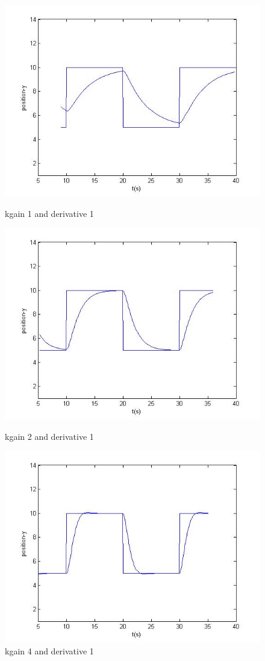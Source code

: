 \begin{figure}[!htb]
\captionsetup{justification=centering}
  \includegraphics[width=\linewidth]{fig/gain1d1.jpg}
  \caption{kgain 1 and derivative 1}
\endminipage\hfill
{}
  \includegraphics[width=\linewidth]{fig/gain2d1.jpg}
  \caption{kgain 2 and derivative 1}
\endminipage\hfill
{}%
  \includegraphics[width=\linewidth]{fig/gain4d1.jpg}
  \caption{kgain 4 and derivative 1}
\endminipage
\end{figure}
